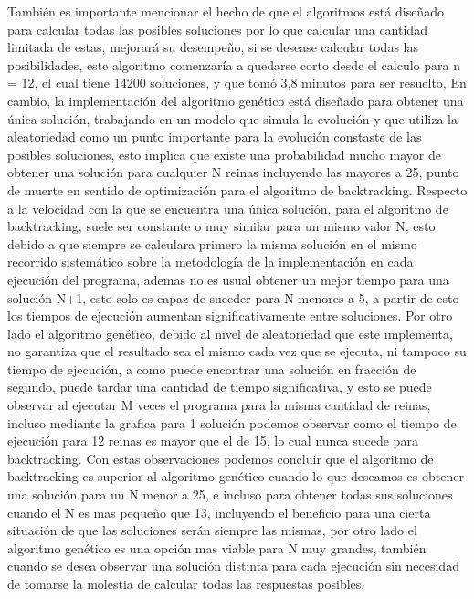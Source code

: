 \documentclass[12pt,a4paper]{article}
\begin{document}
También es importante mencionar el hecho de que el algoritmos está diseñado para calcular todas las posibles soluciones por lo que calcular una cantidad limitada de estas, mejorará su desempeño, si se desease calcular todas las posibilidades, este algoritmo comenzaría a quedarse corto desde el calculo para n = 12, el cual tiene 14200 soluciones, y que tomó 3,8 minutos para ser resuelto, En cambio, la implementación del algoritmo genético está diseñado para obtener una única solución, trabajando en un modelo que simula la evolución y que utiliza la aleatoriedad como un punto importante para la evolución constaste de las posibles soluciones, esto implica que existe una probabilidad mucho mayor de obtener una solución para cualquier N reinas incluyendo las mayores a 25, punto de muerte en sentido de optimización para el algoritmo de backtracking.
Respecto a la velocidad con la que se encuentra una única solución, para el algoritmo de backtracking, suele ser constante o muy similar para un mismo valor N, esto debido a que siempre se calculara primero la misma solución en el mismo recorrido sistemático sobre la metodología de la implementación  en cada ejecución del programa, ademas no es usual obtener un mejor tiempo para una solución N+1, esto solo es capaz de suceder para N menores a 5, a partir de esto los tiempos de ejecución aumentan significativamente entre soluciones. Por otro lado el algoritmo genético, debido al nivel de aleatoriedad que este implementa, no garantiza que el resultado sea el mismo cada vez que se ejecuta, ni tampoco su tiempo de ejecución, a como puede encontrar una solución en fracción de segundo, puede tardar una cantidad de tiempo significativa, y esto se puede observar al ejecutar M veces el programa para la misma cantidad de reinas,  incluso mediante la grafica para 1 solución podemos observar como el tiempo de ejecución para 12 reinas es mayor que el de 15, lo cual nunca sucede para backtracking.
Con estas observaciones podemos concluir que el algoritmo de backtracking es superior al algoritmo genético cuando lo que deseamos es obtener una solución para un N menor a 25,  e incluso para obtener todas sus soluciones cuando el N es mas pequeño que 13, incluyendo el beneficio para una cierta situación de que las soluciones serán siempre las mismas, por otro lado el algoritmo genético es una opción mas viable para N muy grandes, también cuando se desea observar una solución distinta para cada ejecución sin necesidad de tomarse la molestia de calcular todas las respuestas posibles.

\pagebreak
\end{document}
